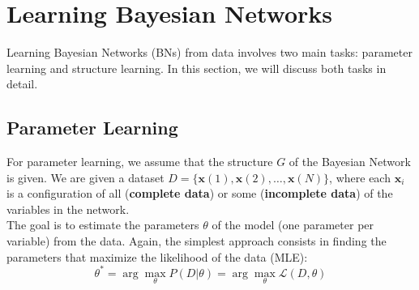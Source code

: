 \section{Learning Bayesian Networks}
Learning Bayesian Networks (BNs) from data involves two main tasks: parameter learning and structure learning. 
In this section, we will discuss both tasks in detail.

\subsection{Parameter Learning}
For parameter learning, we assume that the structure $G$ of the Bayesian Network is given.
We are given a dataset $D = \{\boldsymbol{x}(1), \boldsymbol{x}(2), \ldots, \boldsymbol{x}(N)\}$, 
where each $\boldsymbol{x}_i$ is a configuration of all (\textbf{complete data}) or 
some (\textbf{incomplete data}) of the variables in the network.
\\The goal is to estimate the parameters $\theta$ of the model (one parameter per variable) from the data.
Again, the simplest approach consists in finding the parameters that maximize the likelihood of the data (MLE):
\[ \theta^* = \arg\max_{\theta} P(D | \theta) = \arg\max_{\theta} \mathcal{L}(D, \theta) \]

